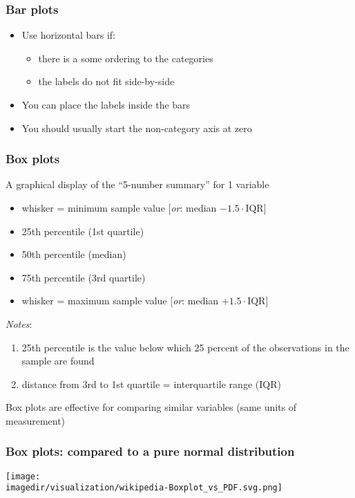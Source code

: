 \begin{frame}\frametitle{Bar plots}
	\begin{itemize}
		\item	Use horizontal bars if: 
		\begin{itemize}
			\item	there is a some ordering to the categories 
			\item	the labels do not fit side-by-side\pause 
		\end{itemize}
	\end{itemize}
	\begin{itemize}
		\item	You can place the labels inside the bars\pause 
	\end{itemize}
	\begin{itemize}
		\item	You should usually start the non-category axis at zero 
	\end{itemize}
\end{frame}

\begin{frame}\frametitle{Box plots}
	
	A graphical display of the ``5-number summary'' for 1 variable 
	\begin{itemize}
		\item	whisker = minimum sample value [\emph{or}: median $- 1.5\cdot\text{IQR}$]
		\item	25th percentile (1st quartile) 
		\item	50th percentile (median) 
		\item	75th percentile (3rd quartile) 
		\item	whisker = maximum sample value [\emph{or}: median $+ 1.5\cdot\text{IQR}$]
	\end{itemize}
	
	\emph{Notes}: 
	\begin{enumerate}
		\item	25th percentile is the value below which 25 percent of the observations in the sample are found 
		\item	distance from 3rd to 1st quartile = interquartile range (IQR) 
	\end{enumerate}
	
	Box plots are effective for comparing similar variables (same units of measurement)
\end{frame}

\begin{frame}\frametitle{Box plots: compared to a pure normal distribution}
	\begin{center}
		\texttt{[image: \\imagedir/visualization/wikipedia-Boxplot\_vs\_PDF.svg.png]}
	\end{center}
	\vspace{-16pt}
\end{frame}

